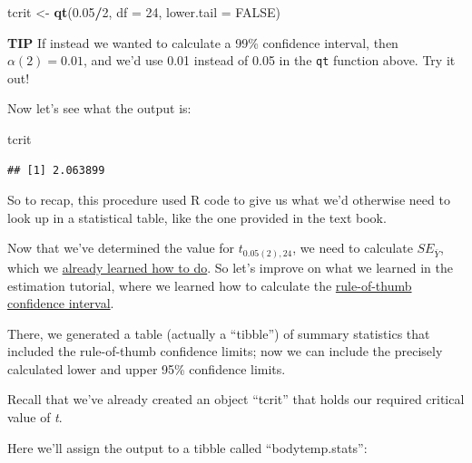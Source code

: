 \documentclass[
]{book}
\newenvironment{Shaded}{\begin{snugshade}}{\end{snugshade}}
\newcommand{\AttributeTok}[1]{\textcolor[rgb]{0.13,0.29,0.53}{#1}}
\newcommand{\ConstantTok}[1]{\textcolor[rgb]{0.56,0.35,0.01}{#1}}
\newcommand{\DecValTok}[1]{\textcolor[rgb]{0.00,0.00,0.81}{#1}}
\newcommand{\FloatTok}[1]{\textcolor[rgb]{0.00,0.00,0.81}{#1}}
\newcommand{\FunctionTok}[1]{\textcolor[rgb]{0.13,0.29,0.53}{\textbf{#1}}}
\newcommand{\NormalTok}[1]{#1}
\newcommand{\OtherTok}[1]{\textcolor[rgb]{0.56,0.35,0.01}{#1}}
\newcommand{\SpecialCharTok}[1]{\textcolor[rgb]{0.81,0.36,0.00}{\textbf{#1}}}
\begin{document}
\begin{Shaded}
\begin{Highlighting}[]
\NormalTok{tcrit }\OtherTok{\textless{}{-}} \FunctionTok{qt}\NormalTok{(}\FloatTok{0.05}\SpecialCharTok{/}\DecValTok{2}\NormalTok{, }\AttributeTok{df =} \DecValTok{24}\NormalTok{, }\AttributeTok{lower.tail =} \ConstantTok{FALSE}\NormalTok{)}
\end{Highlighting}
\end{Shaded}

\textbf{TIP }
If instead we wanted to calculate a 99\% confidence interval, then \(\alpha(2) = 0.01\), and we'd use 0.01 instead of 0.05 in the \texttt{qt} function above. Try it out!

Now let's see what the output is:

\begin{Shaded}
\begin{Highlighting}[]
\NormalTok{tcrit}
\end{Highlighting}
\end{Shaded}

\begin{verbatim}
## [1] 2.063899
\end{verbatim}

So to recap, this procedure used R code to give us what we'd otherwise need to look up in a statistical table, like the one provided in the text book.

Now that we've determined the value for \(t_{0.05(2),24}\), we need to calculate \(SE_{\bar{Y}}\), which we \hyperref[sem_page]{already learned how to do}.
So let's improve on what we learned in the estimation tutorial, where we learned how to calculate the \hyperref[confint_rough]{rule-of-thumb confidence interval}.

There, we generated a table (actually a ``tibble'') of summary statistics that included the rule-of-thumb confidence limits; now we can include the precisely calculated lower and upper 95\% confidence limits.

Recall that we've already created an object ``tcrit'' that holds our required critical value of \emph{t}.

Here we'll assign the output to a tibble called ``bodytemp.stats'':
\end{document}
